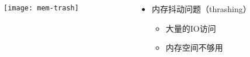 %
\begin{frame}[plain]
	\frametitle{ }
	\begin{columns}
		\begin{column}{.5\textwidth}
	
	\texttt{[image: mem-trash]}
	
\end{column}

		\begin{column}{.5\textwidth}
			
			\begin{itemize}\Large
				\item 内存抖动问题（thrashing）
				\begin{itemize}\large
					\item 大量的IO访问
					\item 内存空间不够用
				\end{itemize}
			\end{itemize}
			
		\end{column}
		

	\end{columns}
\end{frame}



